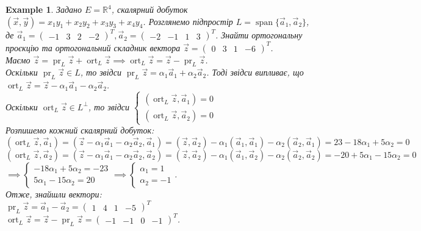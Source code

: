 \documentclass[a4paper, 10pt]{article}
\theoremstyle{theoremdd}
\newtheorem{example}[theorem]{Example}
\DeclareMathOperator{\linspan}{span}
\DeclareMathOperator{\ort}{ort}
\DeclareMathOperator{\pr}{pr}
\begin{document}
\begin{example}
\label{how_to_find_proj_and_ort}
Задано $E = \mathbb{R}^4$, скалярний добуток $(\vec{x},\vec{y}) = x_1y_1+x_2y_2+x_3y_3+x_4y_4$. Розглянемо підпростір $L = \linspan\{ \vec{a}_1, \vec{a}_2 \}$, де $\vec{a}_1 = \begin{pmatrix}
-1 & 3 & 2 & -2
\end{pmatrix}^T, \vec{a}_2 = \begin{pmatrix}
-2 & -1 & 1 & 3
\end{pmatrix}^T$. Знайти ортогональну проєкцію та ортогональний складник вектора $\vec{z} = \begin{pmatrix}
0 & 3 & 1 & -6
\end{pmatrix}^T$.\\
Маємо $\vec{z} = \pr_L \vec{z} + \ort_L \vec{z} \implies \ort_L \vec{z} = \vec{z} - \pr_L \vec{z}$.\\
Оскільки $\pr_L \vec{z} \in L$, то звідси $\pr_L \vec{z} = \alpha_1 \vec{a}_1 + \alpha_2 \vec{a}_2$. Тоді звідси випливає, що\\
$\ort_L \vec{z} = \vec{z} - \alpha_1 \vec{a}_1 - \alpha_2 \vec{a}_2$.\\
Оскільки $\ort_L \vec{z} \in L^\perp$, то звідси $\begin{cases} (\ort_L \vec{z}, \vec{a}_1) = 0 \\ (\ort_L \vec{z}, \vec{a}_2) = 0 \end{cases}$\\
Розпишемо кожний скалярний добуток:\\
$(\ort_L \vec{z}, \vec{a}_1) = (\vec{z} - \alpha_1 \vec{a}_1 - \alpha_2 \vec{a}_2, \vec{a}_1) = (\vec{z}, \vec{a}_2) - \alpha_1 (\vec{a}_1,\vec{a}_1) - \alpha_2 (\vec{a}_2, \vec{a}_1) = 23 - 18 \alpha_1 +5\alpha_2 = 0$\\
$(\ort_L \vec{z}, \vec{a}_2) = (\vec{z} - \alpha_1 \vec{a}_1 - \alpha_2 \vec{a}_2, \vec{a}_2) = (\vec{z}, \vec{a}_2) - \alpha_1 (\vec{a}_1,\vec{a}_2) - \alpha_2 (\vec{a}_2, \vec{a}_2) = -20 +5 \alpha_1 - 15 \alpha_2 = 0$\\
$\implies \begin{cases} -18\alpha_1 + 5\alpha_2 = -23 \\ 5\alpha_1-15\alpha_2 = 20  \end{cases} \implies \begin{cases} \alpha_1 = 1 \\ \alpha_2 = -1 \end{cases}$.\\
Отже, знайшли вектори: \\
$\pr_L \vec{z} = \vec{a}_1 - \vec{a}_2 = \begin{pmatrix}
1 & 4 & 1 & -5
\end{pmatrix}^T$\\
$\ort_L \vec{z} = \vec{z} - \pr_L \vec{z} = \begin{pmatrix}
-1 & -1 & 0 & -1
\end{pmatrix}^T$.
\end{example}
\end{document}
